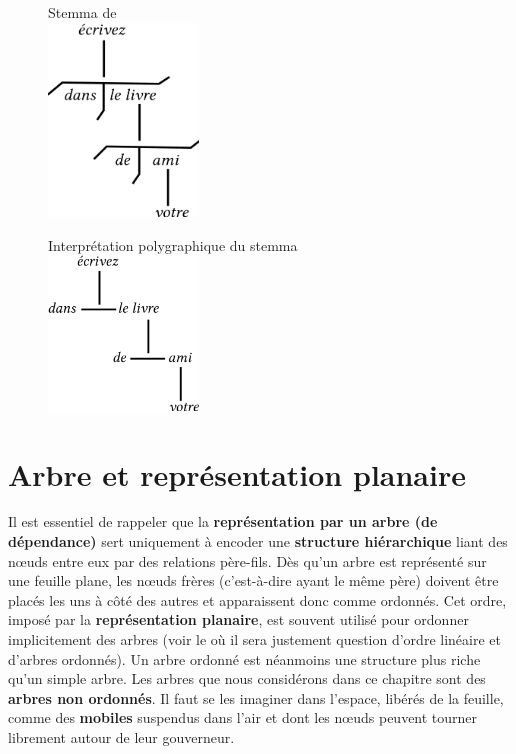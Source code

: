 {    \begin{figure}
    \begin{minipage}[t]{.4\textwidth}\centering
    Stemma de \citet{tesniere1959elements}\medskip\\
    \includegraphics[width=4cm]{figures/StemmadeTesniere}
    \end{minipage}%
    \begin{minipage}[t]{.6\textwidth}\centering
    Interprétation polygraphique du stemma\medskip\\
    \includegraphics[width=4cm]{figures/Stemma}
    \end{minipage}
    \end{figure}
}
\section{Arbre et représentation planaire}\label{sec:3.3.6}

Il est essentiel de rappeler que la \textbf{représentation par un arbre (de} \textbf{dépendance)} sert uniquement à encoder une \textbf{structure hiérarchique} liant des nœuds entre eux par des relations père-fils. Dès qu’un arbre est représenté sur une feuille plane, les nœuds frères (c’est-à-dire ayant le même père) doivent être placés les uns à côté des autres et apparaissent donc comme ordonnés. Cet ordre, imposé par la \textbf{représentation planaire}, est souvent utilisé pour ordonner implicitement des arbres (voir le  où il sera justement question d’ordre linéaire et d’arbres ordonnés). Un arbre ordonné est néanmoins une structure plus riche qu’un simple arbre. Les arbres que nous considérons dans ce chapitre sont des \textbf{arbres non ordonnés}. Il faut se les imaginer dans l’espace, libérés de la feuille, comme des \textbf{mobiles} suspendus dans l’air et dont les nœuds peuvent tourner librement autour de leur gouverneur.

